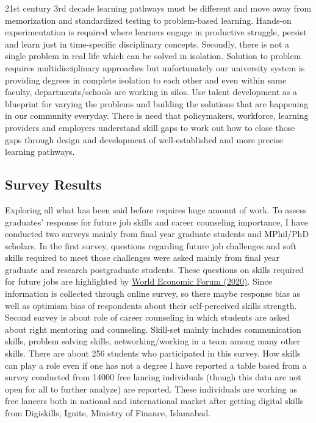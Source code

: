 \documentclass[
]{aft}
\begin{document}
21st century 3rd decade learning pathways must be different and move
away from memorization and standardized testing to problem-based
learning. Hands-on experimentation is required where learners engage in
productive struggle, persist and learn just in time-specific
disciplinary concepts. Secondly, there is not a single problem in real
life which can be solved in isolation. Solution to problem requires
multidisciplinary approaches but unfortunately our university system is
providing degrees in complete isolation to each other and even within
same faculty, departments/schools are working in silos. Use talent
development as a blueprint for varying the problems and building the
solutions that are happening in our community everyday. There is need
that policymakers, workforce, learning providers and employers
understand skill gaps to work out how to close those gaps through design
and development of well-established and more precise learning pathways.

\newpage{}

\hypertarget{survey-results}{%
\subsection{Survey Results}\label{survey-results}}

Exploring all what has been said before requires huge amount of work. To
assess graduates' response for future job skills and career counseling
importance, I have conducted two surveys mainly from final year graduate
students and MPhil/PhD scholars. In the first survey, questions
regarding future job challenges and soft skills required to meet those
challenges were asked mainly from final year graduate and research
postgraduate students. These questions on skills required for future
jobs are highlighted by
\href{https://www.weforum.org/events/the-jobs-reset-summit-2020}{World
Economic Forum (2020)}. Since information is collected through online
survey, so there maybe response bias as well as optimism bias of
respondents about their self-perceived skills strength. Second survey is
about role of career counseling in which students are asked about right
mentoring and counseling. Skill-set mainly includes communication
skills, problem solving skills, networking/working in a team among many
other skills. There are about 256 students who participated in this
survey. How skills can play a role even if one has not a degree I have
reported a table based from a survey conducted from 14000 free lancing
individuals (though this data are not open for all to further analyze)
are reported. These individuals are working as free lancers both in
national and international market after getting digital skills from
Digiskills, Ignite, Ministry of Finance, Islamabad.
\end{document}
